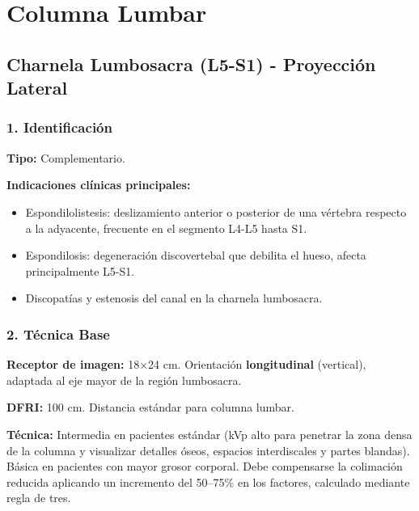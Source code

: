 		
		\section{Columna Lumbar}
		
		\subsection{Charnela Lumbosacra (L5-S1) - Proyección Lateral}
		
		\subsubsection*{1. Identificación}
		
		\textbf{Tipo:} Complementario.
		
		\textbf{Indicaciones clínicas principales:}
		\begin{itemize}
			\item Espondilolistesis: deslizamiento anterior o posterior de una vértebra respecto a la adyacente, frecuente en el segmento L4-L5 hasta S1.
			\item Espondilosis: degeneración discovertebal que debilita el hueso, afecta principalmente L5-S1.
			\item Discopatías y estenosis del canal en la charnela lumbosacra.
		\end{itemize}
		
		\subsubsection*{2. Técnica Base}
		
		\textbf{Receptor de imagen:} 18$\times$24 cm. Orientación \textbf{longitudinal} (vertical), adaptada al eje mayor de la región lumbosacra.
		
		\textbf{DFRI:} 100 cm. Distancia estándar para columna lumbar.
		
		\textbf{Técnica:} Intermedia en pacientes estándar (kVp alto para penetrar la zona densa de la columna y visualizar detalles óseos, espacios interdiscales y partes blandas). Básica en pacientes con mayor grosor corporal. Debe compensarse la colimación reducida aplicando un incremento del 50--75\% en los factores, calculado mediante regla de tres.
		
